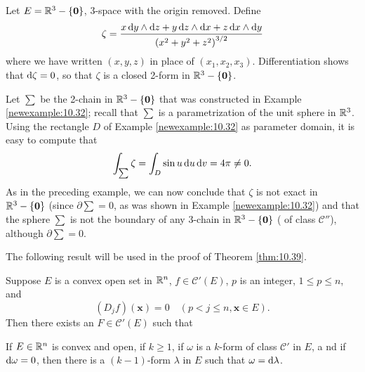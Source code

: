 \begin{newexample}
    \label{newexample:10.37}
    Let $E = {\protect\mathbb R}^3 - \{\mathbf{0}\}$, 3-space with the origin removed.
    Define 
    \begin{equation}
        \label{eq:10.114}
        \zeta = 
        \frac{
            x \d y \wedge \d z + 
            y \d z \wedge \d x + 
            z \d x \wedge \d y 
        }{\left( x^2+y^2+z^2 \right)^{3/2}}
    \end{equation}
    where we have written $(x, y, z)$ in place of $(x_1, x_2 , x_3)$. Differentiation shows that $\d \zeta = 0$, so that $\zeta$ is a closed 2-form in ${\protect\mathbb R}^3 - \{\mathbf{0}\}$. 
    
    Let $\sum$ be the 2-chain in ${\protect\mathbb R}^3 - \{\mathbf{0}\}$ that was constructed in Example \ref{newexample:10.32}; 
    recall that $\sum$ is a parametrization of the unit sphere in ${\protect\mathbb R}^3$. 
    Using the rectangle $D$ of Example \ref{newexample:10.32} as parameter domain, it is easy to compute that
    \begin{equation}
        \label{eq:10.115}
        \int_{\sum} \zeta = 
        \int_{D}    \sin u \d u \d v =
        4 \pi \neq 0 .
    \end{equation}
    As in the preceding example, we can now conclude that $\zeta$ is not exact in ${\protect\mathbb R}^3 - \{\mathbf{0}\}$ 
    (since $\partial \sum = 0$, as was shown in Example \ref{newexample:10.32}) 
    and that the sphere $\sum$ is not the boundary of any 3-chain in ${\protect\mathbb R}^3 - \{\mathbf{0}\}$ ( of class $\mathscr{C}''$), although $\partial \sum = 0$. 
    
    The following result will be used in the proof of Theorem \ref{thm:10.39}.
\end{newexample}

\begin{thm}
    \label{thm:10.38}
    Suppose $E$ is a convex open set in ${\protect\mathbb R}^n$,
    $f \in \mathscr{C}'(E)$, $p$ is an integer, 
    $1 \leq p \leq n$, and
    \begin{equation}
        \label{eq:10.116}
        (D_j f)(\mathbf{x}) = 0
        \quad 
        (p < j \leq n, \mathbf{x} \in E).
    \end{equation}
    Then there exists an $F \in \mathscr{C}'(E)$ such that
\end{thm}

\begin{thm}
    \label{thm:10.39}
    If $E \in {\protect\mathbb R}^n$ is convex and open, 
    if $k \geq 1$, 
    if $\omega$ is a $k$-form of class $\mathscr{C}'$ in $E$, a
    nd if $\d \omega = 0$, 
    then there is a $(k - 1)$-form $\lambda$ in $E$ 
    such that $\omega = \d \lambda$.
\end{thm}


